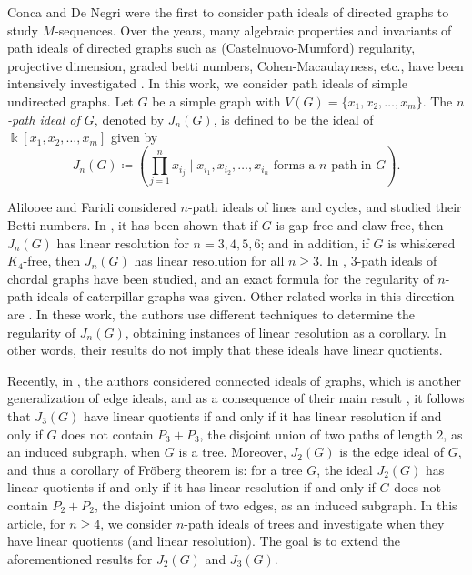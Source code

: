 \documentclass{amsart}
\theoremstyle{remark}
\theoremstyle{definition}
\begin{document}
    
    
    Conca and De Negri \cite{ConcaDeNegri1998} were the first to consider path ideals of directed graphs to study $M$-sequences. Over the years, many algebraic properties and invariants of path ideals of directed graphs such as (Castelnuovo-Mumford) regularity, projective dimension, graded betti numbers, Cohen-Macaulayness, etc., have been intensively investigated \cite{BouchatBrown2017,  BouchatHaOkeefe2011,Erey2020, KianiMadani2016}. In this work, we consider path ideals of simple undirected graphs. Let $G$ be a simple graph with $V(G)=\{x_1, x_2, \dots , x_m\}$. The \textit{$n$-path ideal of $G$}, denoted by $J_n(G)$, is defined to be the ideal of $\Bbbk[x_1,x_2, \dots , x_m]$ given by \[
    J_n(G)\coloneqq \left(\prod_{j=1}^n x_{i_j}\mid x_{i_1},x_{i_2},\dots ,x_{i_n} \text{ forms a }n\text{-path in }G\right).
    \] 
    
    Alilooee and Faridi \cite{AlilooeeFaridi2018, AlilooeeFaridi2015} considered $n$-path ideals of lines and cycles, and studied their Betti numbers. %
    In \cite{Banerjee2017}, it has been shown that if $G$ is gap-free and claw free, then $J_n(G)$ has linear resolution for $n=3,4,5,6$; and in addition, if $G$ is whiskered $K_4$-free, then $J_n(G)$ has linear resolution for all $n\geq 3$. In \cite{DasRoySaha2024}, $3$-path ideals of chordal graphs have been studied, and an exact formula for the regularity of $n$-path ideals of caterpillar graphs was given. Other related works in this direction are \cite{HangVu2025, KumarSarkar2024}. In these work, the authors use different techniques to determine the regularity of $J_n(G)$, obtaining instances of linear resolution as a corollary. In other words, their results do not imply that these ideals have linear quotients.
    
    Recently, in \cite{AJM2024}, the authors considered connected ideals of graphs, which is another generalization of edge ideals, and as a consequence of their main result \cite[Theorem 5.1]{AJM2024}, it follows that $J_3(G)$ have linear quotients if and only if it has linear resolution if and only if $G$ does not contain $P_3+P_3$, the disjoint union of two paths of length 2, as an induced subgraph, when $G$ is a tree. Moreover, $J_2(G)$ is the edge ideal of $G$, and thus a corollary of Fr\"oberg theorem is: for a tree $G$, the ideal $J_2(G)$ has linear quotients if and only if it has linear resolution if and only if $G$ does not contain $P_2+P_2$, the disjoint union of two edges, as an induced subgraph. In this article, for $n\geq 4$, we consider $n$-path ideals of trees and investigate when they have linear quotients (and linear resolution). The goal is to extend the aforementioned results for $J_2(G)$ and $J_3(G)$.
    
\end{document}
